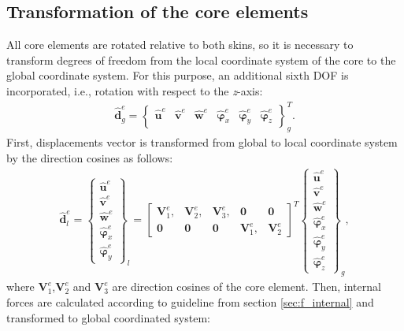 \documentclass[sensors,article,submit,moreauthors,pdftex]{Definitions/mdpi}
\begin{document}
\subsection{Transformation of the core elements}
\label{sec:transformation}
All core elements are rotated relative to both skins, so it is necessary to transform degrees of freedom from the local coordinate system of the core to the global coordinate system.
For this purpose, an additional sixth DOF is incorporated, i.e., rotation with respect to the \textit{z}-axis:
\begin{eqnarray}
	\widehat{\textbf{d}}^e_g = \left \{\begin{array}{cccccc}
		\widehat{\textbf{u}}^e & \widehat{\textbf{v}}^e &
		\widehat{\textbf{w}}^e & \widehat{\boldsymbol{\varphi}}_x^e &
		\widehat{\boldsymbol{\varphi}}_y^e & \widehat{\boldsymbol{\varphi}}_z^e
	\end{array}\right \}^T_g.
	\label{eq:d6}
\end{eqnarray}
First, displacements vector is transformed from global to local coordinate system by the direction cosines as follows:
\begin{eqnarray}
	\widehat{\textbf{d}}^e_l = \left \{\begin{array}{c}
		\widehat{\textbf{u}}^e \\ \widehat{\textbf{v}}^e \\
		\widehat{\textbf{w}}^e \\ \widehat{\boldsymbol{\varphi}}_x^e \\
		\widehat{\boldsymbol{\varphi}}_y^e
	\end{array}\right \}_l = 
	\left [\begin{array}{ccccc}
		\textbf{V}^e_1, & \textbf{V}^e_2, & \textbf{V}^e_3, & \textbf{0} & \textbf{0} \\
		\textbf{0} & \textbf{0} & \textbf{0} & \textbf{V}^e_1, & \textbf{V}^e_2
	\end{array}\right ]^T
	\left \{\begin{array}{c}
	\widehat{\textbf{u}}^e \\ \widehat{\textbf{v}}^e \\
	\widehat{\textbf{w}}^e \\ \widehat{\boldsymbol{\varphi}}_x^e \\
	\widehat{\boldsymbol{\varphi}}_y^e\\
	\widehat{\boldsymbol{\varphi}}_z^e
\end{array}\right \}_g,
	\label{eq:d_local}
\end{eqnarray}
where \(\textbf{V}^e_1\),\(\textbf{V}^e_2\) and \(\textbf{V}^e_3\) are direction cosines of the core element. Then, internal forces are calculated according to guideline from section \ref{sec:f_internal} and transformed to global coordinated system:
\end{document}
